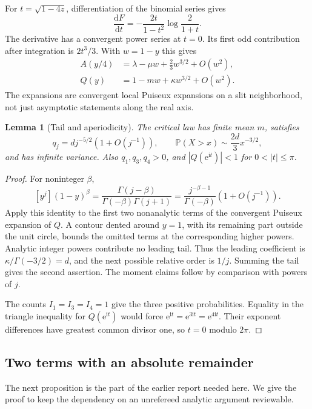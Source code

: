 \documentclass[11pt]{article}
\newtheorem{lemma}[theorem]{Lemma}
\theoremstyle{remark}\newtheorem{remark}[theorem]{Remark}
\theoremstyle{definition}\newtheorem{definition}[theorem]{Definition}
\newcommand{\ii}{\mathrm i}
\newcommand{\dd}{\mathrm d}
\newcommand{\e}{\mathrm e}
\newcommand{\Prob}{\mathbb P}
\begin{document}
For $t=\sqrt{1-4z}$, differentiation of the binomial series gives
\[
 \frac{\dd F}{\dd t}
 =-\frac{2t}{1-t^2}\log\frac2{1+t}.
\]
The derivative has a convergent power series at $t=0$. Its first odd
contribution after integration is $2t^3/3$. With $w=1-y$ this gives
\begin{align}
 A(y/4)&=\lambda-\mu w+\tfrac23w^{3/2}+O(w^2),\label{tss:cx:eq:localA}\\
 Q(y)&=1-mw+\kappa w^{3/2}+O(w^2).
 \label{tss:cx:eq:localQ}
\end{align}
The expansions are convergent local Puiseux expansions on a slit
neighborhood, not just asymptotic statements along the real axis.

\begin{lemma}[Tail and aperiodicity]\label{tss:cx:lem:tail}
The critical law has finite mean $m$, satisfies
\begin{equation}\label{tss:cx:eq:qtail}
 q_j=dj^{-5/2}(1+O(j^{-1})),\qquad
 \Prob(X>x)\sim\frac{2d}{3}x^{-3/2},
\end{equation}
and has infinite variance. Also $q_1,q_3,q_4>0$, and
$|Q(\e^{\ii t})|<1$ for $0<|t|\le\pi$.
\end{lemma}
\begin{proof}
For noninteger $\beta$,
\[
 [y^j](1-y)^\beta
 =\frac{\Gamma(j-\beta)}{\Gamma(-\beta)\Gamma(j+1)}
 =\frac{j^{-\beta-1}}{\Gamma(-\beta)}(1+O(j^{-1})).
\]
Apply this identity to the first two nonanalytic terms of the convergent
Puiseux expansion of $Q$. A contour dented around $y=1$, with its
remaining part outside the unit circle, bounds the omitted terms at
the corresponding higher powers. Analytic integer powers contribute
no leading tail. Thus the leading coefficient is
$\kappa/\Gamma(-3/2)=d$, and the next possible relative order is
$1/j$. Summing the tail gives the second assertion. The moment claims
follow by comparison with powers of $j$.

The counts $I_1=I_3=I_4=1$ give the three positive probabilities.
Equality in the triangle inequality for $Q(\e^{\ii t})$ would force
$\e^{\ii t}=\e^{3\ii t}=\e^{4\ii t}$. Their exponent differences
have greatest common divisor one, so $t=0$ modulo $2\pi$.
\end{proof}

\subsection{Two terms with an absolute remainder}
The next proposition is the part of the earlier report needed here.
We give the proof to keep the dependency on an unrefereed analytic
argument reviewable.
\end{document}
